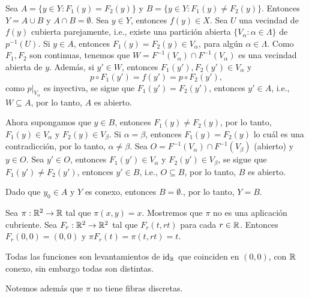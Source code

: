 \begin{dem}
    Sea $A=\{y\in Y:F_1(y)=F_2(y)\}$ y $B=\{y\in Y:F_1(y)\neq F_2(y)\}$. Entonces $Y=A\cup B$ y $A\cap B=\emptyset$. Sea $y\in Y$, entonces $f(y)\in X.$ Sea $U$ una vecindad de $f(y)$ cubierta parejamente, i.e., existe una partición abierta $\{V_\alpha:\alpha\in\Lambda\}$ de $p^{-1}(U)$. Si $y\in A$, entonces $F_1(y)=F_2(y)\in V_{\alpha}$, para algún $\alpha\in\Lambda$. Como $F_1,F_2$ son continuas, tenemos que  $W=F^{-1}(V_\alpha)\cap F^{-1}(V_\alpha)$ es una vecindad abierta de $y$. Además, si $y'\in W$, entonces $F_1(y'), F_2(y')\in V_\alpha$ y 
    \begin{equation*}
        p\circ F_1(y')=f(y')=p\circ F_2(y'),
    \end{equation*}
    como $p|_{V_\alpha}$ es inyectiva, se sigue que $F_1(y')=F_2(y')$, entonces $y'\in A$, i.e., $W\subseteq A$, por lo tanto, $A$ es abierto.

    Ahora supongamos que $y\in B$, entonces $F_1(y)\neq F_2(y)$, por lo tanto, $F_1(y)\in V_{\alpha}$ y $F_2(y)\in V_{\beta}$. Si $\alpha=\beta$, entonces $F_1(y)=F_2(y)$ lo cuál es una contradicción, por lo tanto, $\alpha\neq\beta$. Sea $O=F^{-1}(V_\alpha)\cap F^{-1}(V_\beta)$ (abierto) y $y\in O$. Sea $y'\in O$, entonces $F_1(y')\in V_{\alpha}$ y $F_2(y')\in V_{\beta}$, se sigue que $F_1(y')\neq F_2(y')$, entonces $y'\in B$, i.e., $O\subseteq B$, por lo tanto, $B$ es abierto.

    Dado que $y_0\in A$ y $Y$ es conexo, entonces $B=\emptyset$., por lo tanto, $Y=B$.
\end{dem}
\begin{ejemplo}
    Sea $\pi:\mathbb{R}^2\to\mathbb{R}$ tal que $\pi(x,y)=x$. Mostremos que $\pi$ no es una aplicación cubriente. Sea $F_r:\mathbb{R}^2\to\mathbb{R}^2$ tal que $F_r(t,rt)$ para cada $r\in\mathbb{R}$. Entonces $F_r(0,0)=(0,0)$ y $\pi F_r(t)=\pi(t,rt)=t$. 

    Todas las funciones son levantamientos de $\mathrm{id}_{\mathbb{R}}$ que coinciden en $(0,0)$, con $\mathbb{R}$ conexo, sin embargo todas son distintas. 

    Notemos además que $\pi$ no tiene fibras discretas.
\end{ejemplo}
